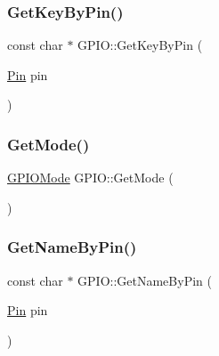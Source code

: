 \subsubsection{\texorpdfstring{Get\+Key\+By\+Pin()}{GetKeyByPin()}}
{\footnotesize\ttfamily const char $\ast$ G\+P\+I\+O\+::\+Get\+Key\+By\+Pin (\begin{DoxyParamCaption}\item[{\hyperlink{namespacecubesat_af928ed4b56ef60d75953a91225b37a00}{Pin}}]{pin }\end{DoxyParamCaption})\hspace{0.3cm}{\ttfamily [static]}}

\mbox{\label{classcubesat_1_1GPIO_a6c9fa56927c168d8db8b1dd62fbc4cde}} 
\subsubsection{\texorpdfstring{Get\+Mode()}{GetMode()}}
{\footnotesize\ttfamily \hyperlink{namespacecubesat_a0c9368193169b1a4ca3aa1ba47331abf}{G\+P\+I\+O\+Mode} G\+P\+I\+O\+::\+Get\+Mode (\begin{DoxyParamCaption}{ }\end{DoxyParamCaption})}

\mbox{\label{classcubesat_1_1GPIO_a676a794c2d2f2f636c7a23f71613e48e}} 
\subsubsection{\texorpdfstring{Get\+Name\+By\+Pin()}{GetNameByPin()}}
{\footnotesize\ttfamily const char $\ast$ G\+P\+I\+O\+::\+Get\+Name\+By\+Pin (\begin{DoxyParamCaption}\item[{\hyperlink{namespacecubesat_af928ed4b56ef60d75953a91225b37a00}{Pin}}]{pin }\end{DoxyParamCaption})\hspace{0.3cm}{\ttfamily [static]}}

\mbox{\label{classcubesat_1_1GPIO_a0681d886f2a688683575716119e4af7a}} 
